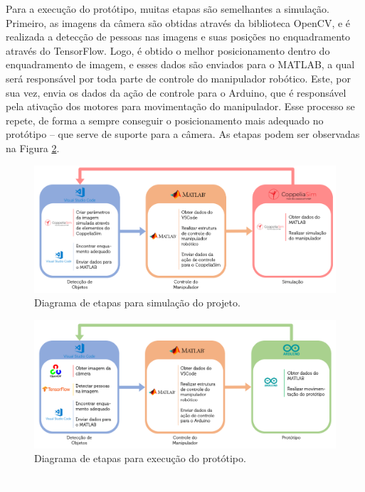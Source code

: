 Para a execução do protótipo, muitas etapas são semelhantes a simulação. Primeiro, as imagens da câmera são obtidas através da biblioteca OpenCV, e é realizada a detecção de pessoas nas imagens e suas posições no enquadramento através do TensorFlow. Logo, é obtido o melhor posicionamento dentro do enquadramento de imagem, e esses dados são enviados para o MATLAB, a qual será responsável por toda parte de controle do manipulador robótico. Este, por sua vez, envia os dados da ação de controle para o Arduino, que é responsável pela ativação dos motores para movimentação do manipulador. Esse processo se repete, de forma a sempre conseguir o posicionamento mais adequado no protótipo – que serve de suporte para a câmera. As etapas podem ser observadas na Figura \ref{fig:DiagramaPrototipo}.

\begin{figure}[h!]
\centering
\includegraphics[width=0.9\columnwidth]{Imagens/DiagramaSimulacao.PNG}
\caption{Diagrama de etapas para simulação do projeto.}
\label{fig:DiagramaSimulacao}
\end{figure}

\begin{figure}[h!]
\centering
\includegraphics[width=0.9\columnwidth]{Imagens/DiagramaPrototipo.PNG}
\caption{Diagrama de etapas para execução do protótipo.}
\label{fig:DiagramaPrototipo}
\end{figure}



\textcolor{white}{.}

